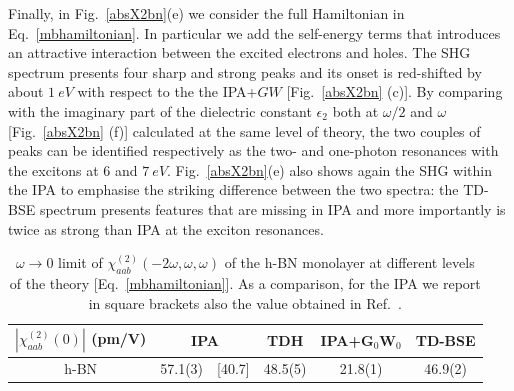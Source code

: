 Finally, in Fig.~\ref{absX2bn}(e) we consider the full Hamiltonian in Eq.~\eqref{mbhamiltonian}. In particular we add the self-energy terms that introduces an attractive interaction between the excited electrons and holes\cite{strinati}. The SHG spectrum presents four sharp and strong peaks and its onset is red-shifted by about $1~eV$ with respect to the the IPA+$GW$ [Fig.~\ref{absX2bn} (c)]. By comparing with the imaginary part of the dielectric constant $\epsilon_2$ both at $\omega/2$ and  $\omega$ [Fig.~\ref{absX2bn} (f)] calculated at the same level of theory, the two couples of peaks can be identified respectively as the two- and one-photon resonances with the excitons at $6$ and $7~eV$.  Fig.~\ref{absX2bn}(e) also shows again the SHG within the IPA to emphasise the striking difference between the two spectra: the TD-BSE spectrum presents features that are missing in IPA and more importantly is twice as strong than IPA at the exciton resonances. 



\begin{center}
\begin{table}[h]
\small
\begin{tabular}{c|cc|c|c|c}
\hline
$|\chi^{(2)}_{aab} (0)| $ (pm/V) & \multicolumn{2}{c|}{IPA} & TDH & IPA+G$_0$W$_0$ & TD-BSE  \\
\hline
 h-BN &  57.1(3)  & [40.7] & 48.5(5) &  21.8(1)  & 46.9(2)  \\
\hline
\end{tabular}
\caption{$\omega\rightarrow 0$ limit of $\chi^{(2)}_{aab} (-2\omega,\omega,\omega)$ of the h-BN monolayer at different levels of the theory [Eq.~\eqref{mbhamiltonian}]. As a comparison, for the IPA we report in square brackets also the value obtained in Ref.~\cite{guo2005second}.\label{tab1}}  
\end{table}
\end{center} 

